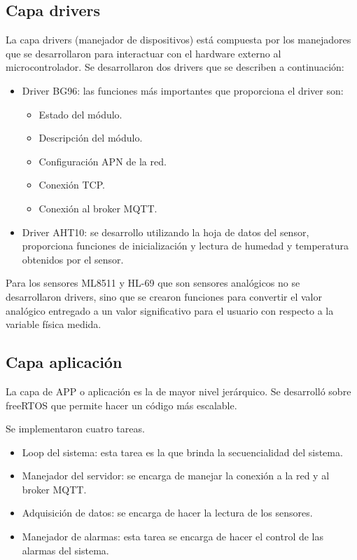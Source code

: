 \subsection{Capa drivers} 
La capa drivers (manejador de dispositivos) está compuesta por los manejadores que se desarrollaron para interactuar con el hardware externo al microcontrolador. Se desarrollaron dos drivers que se describen a continuación:
\begin{itemize}
  \item Driver BG96: las funciones más importantes que proporciona el driver son:
  \begin{itemize}
    \item Estado del módulo.
    \item Descripción del módulo.
    \item Configuración APN de la red.
    \item Conexión TCP.
    \item Conexión al broker MQTT.
  \end{itemize}
  \item Driver AHT10: se desarrollo utilizando la hoja de datos del sensor, proporciona funciones de inicialización y lectura de humedad y temperatura obtenidos por el sensor.
\end{itemize}
Para los sensores ML8511 y HL-69 que son sensores analógicos no se desarrollaron drivers, sino que se crearon funciones para convertir el valor analógico entregado a un valor significativo para el usuario con respecto a la variable física medida.
\subsection{Capa aplicación} 
La capa de APP o aplicación  es la de mayor nivel jerárquico. Se desarrolló sobre freeRTOS 
que permite hacer un código más escalable.

Se implementaron cuatro tareas.
\begin{itemize}
    \item Loop del sistema: esta tarea es la que brinda la secuencialidad del sistema.
    \item Manejador del  servidor: se encarga de manejar la conexión a la red y al broker MQTT.
    \item Adquisición de datos: se encarga de hacer la lectura de los sensores.
    \item Manejador de alarmas: esta tarea se encarga de hacer el control de las alarmas del sistema.
\end{itemize}
\clearpage

